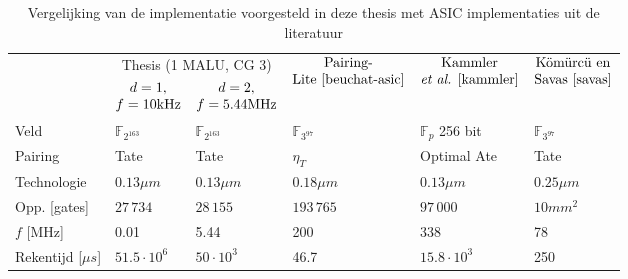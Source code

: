 \begin{table}[h]
	\caption{Vergelijking van de implementatie voorgesteld in deze thesis met ASIC implementaties uit de literatuur}
	\label{tabel-resultaten-asic}

	\begin{narrow}{-2cm}{-2cm}
		\centering
		\begin{tabular}{llllll}
			\toprule
			&	\multicolumn{2}{c}{Thesis (1 MALU, CG 3)}	& \multirow{2}{*}{$\begin{array}{@{}c@{}}\text{Pairing-}\\\text{Lite \cite{beuchat-asic}}\end{array}$}	& \multicolumn{1}{c}{\multirow{2}{*}{$\begin{array}{@{}c@{}}\text{Kammler}\\\text{\emph{et al.} \cite{kammler}}\end{array}$}}	&  \multicolumn{1}{c}{\multirow{2}{*}{$\begin{array}{@{}c@{}}\text{K\"om\"urc\"u en}\\\text{Savas \cite{savas}}\end{array}$}}\\
			\cmidrule(r){2-3}
			& \multicolumn{1}{c}{$\begin{array}{@{}c@{}}d = 1,\\f = 10\text{kHz}\end{array}$} & \multicolumn{1}{c}{$\begin{array}{@{}c@{}}d = 2,\\f = 5.44\text{MHz}\end{array}$} & & &\\
	 		\midrule
			Veld																				& $\mathbb{F}_{2^{163}}$	& $\mathbb{F}_{2^{163}}$	& $\mathbb{F}_{3^{97}}$	& $\mathbb{F}_{p}$ 256 bit	& $\mathbb{F}_{3^{97}}$ \\
			Pairing																			& Tate							& Tate							& $\eta_T$					& Optimal Ate 					& Tate\\
			Technologie																		& $0.13 \mu m$					& $0.13 \mu m$					& $0.18 \mu m$				& $0.13 \mu m$					& $0.25 \mu m$\\
			Opp. [gates]																	& $27\,734$						& $28\,155$						& $193\,765$				& $97\,000$						& \emph{$10mm^2$}\footnotemark[2]\\
			$f$ [MHz]																		& 0.01							& 5.44							& 200							& 338								& 78\\
			Rekentijd [$\mu s$]															& $51.5 \cdot 10^6$			& $50 \cdot 10^3$				& 46.7						& $15.8 \cdot 10^3$			& 250\footnotemark[3]\\

\end{tabular}
\end{narrow}
\end{table}
